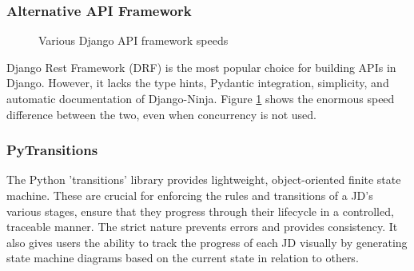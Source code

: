 \subsubsection{Alternative API Framework}
\begin{figure}[h]
\centering
{}
\vspace{-15pt}
\caption{Various Django API framework speeds}
\vspace{-10pt}
\caption*{\parencite{vitaliy_kucheryaviy_django_2024}
\label{fig:Django-Ninja-speed}}
\vspace{-5pt}
\end{figure}
Django Rest Framework (DRF) is the most popular choice for building APIs in Django. However, it lacks the type hints, Pydantic integration, simplicity, and automatic documentation of Django-Ninja. Figure \ref{fig:Django-Ninja-speed} shows the enormous speed difference between the two, even when concurrency is not used.

\subsubsection{PyTransitions}
The Python 'transitions' library provides lightweight, object-oriented finite state machine. These are crucial for enforcing the rules and transitions of a JD's various stages, ensure that they progress through their lifecycle in a controlled, traceable manner. The strict nature prevents errors and provides consistency. It also gives users the ability to track the progress of each JD visually by generating state machine diagrams based on the current state in relation to others.

